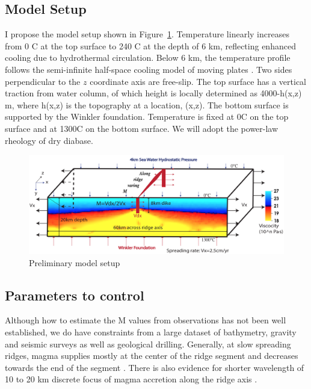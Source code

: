 \subsection{Model Setup}
I propose the model setup shown in Figure~\ref{fig_Methods8_1}. Temperature linearly increases from 0 \degree C at the top surface to 240 \degree C at the depth of 6 km, reflecting enhanced cooling due to hydrothermal circulation. Below 6 km, the temperature profile follows the semi-infinite half-space cooling model of moving plates \citep[e.g.,][]{Turcotte2002}. Two sides perpendicular to the $z$ coordinate axis are free-slip. The top surface has a vertical traction from water column, of which height is locally determined as 4000-h(x,z) m, where h(x,z) is the topography at a location, (x,z). The bottom surface is supported by the Winkler foundation. Temperature is fixed at 0\degree C on the top surface and at 1300\degree C on the bottom surface. We will adopt the power-law rheology of dry diabase\citep[e.g.,][]{Kirby1987, Buck2005}. 

\begin{figure}[H]
 \centering
  \includegraphics[width=1.0\textwidth] {fig_Methods8_1.png}
 \caption{\small Preliminary model setup}
 \label{fig_Methods8_1}
\end{figure}


\subsection{Parameters to control}
Although how to estimate the M values from observations has not been well established, we do have constraints from a large dataset of bathymetry, gravity and seismic surveys as well as geological drilling. Generally, at slow spreading ridges, magma supplies mostly at the center of the ridge segment and decreases towards the end of the segment \citep{Tolstoy1993,Chen1999}. There is also evidence for shorter wavelength of 10 to 20 km discrete focus of magma accretion along the ridge axis \citep{Lin1990}. 

